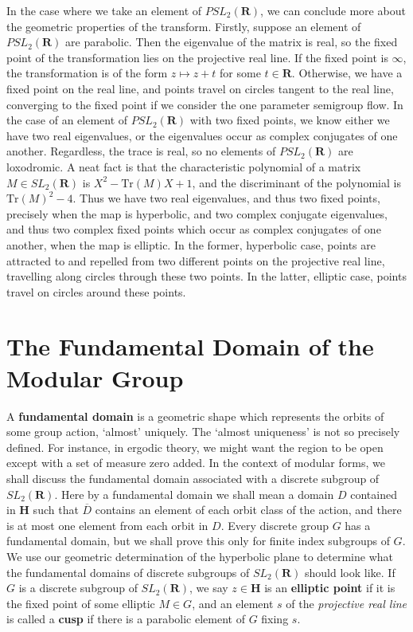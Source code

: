 In the case where we take an element of $PSL_2(\mathbf{R})$, we can conclude more about the geometric properties of the transform. Firstly, suppose an element of $PSL_2(\mathbf{R})$ are parabolic. Then the eigenvalue of the matrix is real, so the fixed point of the transformation lies on the projective real line. If the fixed point is $\infty$, the transformation is of the form $z \mapsto z + t$ for some $t \in \mathbf{R}$. Otherwise, we have a fixed point on the real line, and points travel on circles tangent to the real line, converging to the fixed point if we consider the one parameter semigroup flow. In the case of an element of $PSL_2(\mathbf{R})$ with two fixed points, we know either we have two real eigenvalues, or the eigenvalues occur as complex conjugates of one another. Regardless, the trace is real, so no elements of $PSL_2(\mathbf{R})$ are loxodromic. A neat fact is that the characteristic polynomial of a matrix $M \in SL_2(\mathbf{R})$ is $X^2 - \text{Tr}(M) X + 1$, and the discriminant of the polynomial is $\text{Tr}(M)^2 - 4$. Thus we have two real eigenvalues, and thus two fixed points, precisely when the map is hyperbolic, and two complex conjugate eigenvalues, and thus two complex fixed points which occur as complex conjugates of one another, when the map is elliptic. In the former, hyperbolic case, points are attracted to and repelled from two different points on the projective real line, travelling along circles through these two points. In the latter, elliptic case, points travel on circles around these points.

\section{The Fundamental Domain of the Modular Group}

A {\bf fundamental domain} is a geometric shape which represents the orbits of some group action, `almost' uniquely. The `almost uniqueness' is not so precisely defined. For instance, in ergodic theory, we might want the region to be open except with a set of measure zero added. In the context of modular forms, we shall discuss the fundamental domain associated with a discrete subgroup of $SL_2(\mathbf{R})$. Here by a fundamental domain we shall mean a domain $D$ contained in $\mathbf{H}$ such that $\overline{D}$ contains an element of each orbit class of the action, and there is at most one element from each orbit in $D$. Every discrete group $G$ has a fundamental domain, but we shall prove this only for finite index subgroups of $G$. We use our geometric determination of the hyperbolic plane to determine what the fundamental domains of discrete subgroups of $SL_2(\mathbf{R})$ should look like. If $G$ is a discrete subgroup of $SL_2(\mathbf{R})$, we say $z \in \mathbf{H}$ is an {\bf elliptic point} if it is the fixed point of some elliptic $M \in G$, and an element $s$ of the {\it projective real line} is called a {\bf cusp} if there is a parabolic element of $G$ fixing $s$.

